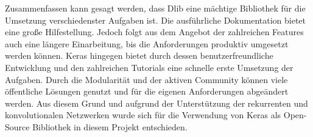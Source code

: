 \documentclass[12pt, a4paper]{report}
\begin{document}
%  
Zusammenfassen kann gesagt werden, dass Dlib eine mächtige Bibliothek für die Umsetzung verschiedenster Aufgaben ist. Die ausführliche Dokumentation bietet eine große Hilfestellung. Jedoch folgt aus dem Angebot der zahlreichen Features auch eine längere Einarbeitung, bis die Anforderungen produktiv umgesetzt werden können. 
\newline
Keras hingegen bietet durch dessen benutzerfreundliche Entwicklung und den zahlreichen Tutorials eine schnelle erste Umsetzung der Aufgaben. Durch die Modularität und der aktiven Community können viele öffentliche Lösungen genutzt und für die eigenen Anforderungen abgeändert werden. 
Aus diesem Grund und aufgrund der Unterstützung der rekurrenten und konvolutionalen Netzwerken wurde sich für die Verwendung von Keras als Open-Source Bibliothek in diesem Projekt entschieden.
\end{document}
